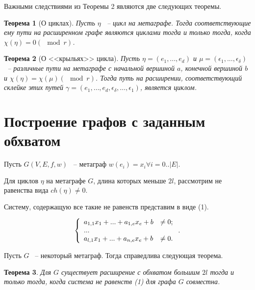 \documentclass[14pt]{mmcs-article}
\newtheorem{theorem}{Теорема}
\begin{document}
Важными следствиями из Теоремы 2 являются две следующих теоремы.

\begin{theorem}[О циклах]

Пусть $\eta$ ~-- цикл на метаграфе. Тогда соответствующие ему пути на расширенном графе являются циклами тогда и только тогда, когда $\chi(\eta) = 0 (\mod{r})$.

\end{theorem}

\begin{theorem}[О <<крыльях>> цикла]

Пусть $\eta = (e_1, ..., e_d)$ и $\mu = (\epsilon_1, ..., \epsilon_{\delta})$ ~-- различные пути на метаграфе с начальной вершиной $a$, конечной вершиной $b$ и $\chi(\eta) = \chi(\mu) (\mod{r})$. Тогда путь на расширении, соответствующий склейке этих путей $\gamma = (e_1, \dots, e_d, \epsilon_{\delta}, \dots, \epsilon_1)$, является циклом.

\end{theorem}

\section{Построение графов с заданным обхватом}

Пусть $G(V, E, f, w)$ ~-- метаграф $w(e_i) = x_i \forall i = 0..|E|$.

Для циклов $\eta$ на метаграфе $G$, длина которых меньше $2l$, рассмотрим не равенства вида $ch(\eta) \neq 0$.

Систему, содержащую все такие не равенств представим в виде (1).

\begin{equation}
    \centering
    \left\{
        \begin{array}{ll}
            a_{1,1} x_1 + ... + a_{1,e} x_e + b &\neq 0 ; \\
            ...\\
            a_{l,1} x_1 + ... + a_{n,e} x_e + b &\neq 0 .\\
        \end{array}
    \right..
    \label{eqs:example}
\end{equation}

Пусть $G$ ~-- некоторый метаграф. Тогда справедлива следующая теорема.

\begin{theorem}

Для $G$ существует расширение с обхватом большим $2l$  тогда и только тогда, когда система не равенств (1) для графа $G$ совместна.

\end{theorem}
\end{document}
